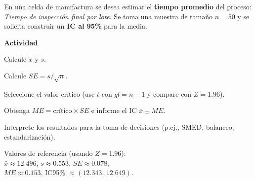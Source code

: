 \begin{ejercicio}[Tiempo de inspección final por lote (n=50)]
En una celda de manufactura se desea estimar el \textbf{tiempo promedio} del proceso: \emph{Tiempo de inspección final por lote}.
Se toma una muestra de tamaño $n=50$ y se solicita construir un \textbf{IC al 95\%} para la media.


\textbf{Actividad}
\begin{pasos}
  \item Calcule $\bar{x}$ y $s$.
  \item Calcule $SE = s/\sqrt{n}$.
  \item Seleccione el valor crítico (use $t$ con $gl=n-1$ y compare con $Z=1.96$).
  \item Obtenga $ME=\text{crítico}\times SE$ e informe el IC $\bar{x}\pm ME$.
  \item Interprete los resultados para la toma de decisiones (p.ej., SMED, balanceo, estandarización).
\end{pasos}

\begin{clave}
\noindent Valores de referencia (usando $Z=1.96$):\\
$\bar{x} \approx 12.496$, \quad $s \approx 0.553$, \quad $SE \approx 0.078$,\\
$ME \approx 0.153$, \quad IC95\% $\approx (12.343,\, 12.649)$.
\end{clave}
\end{ejercicio}


